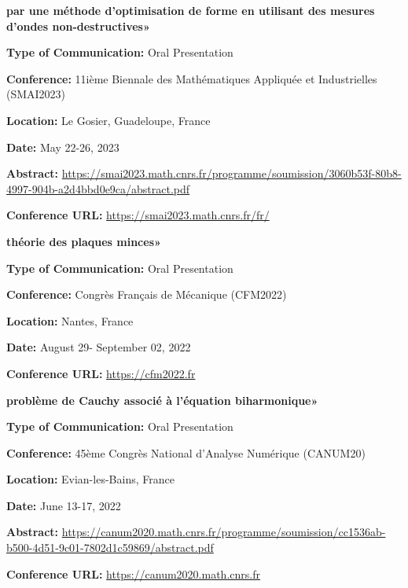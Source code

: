 \documentclass[10pt]{article} %
\begin{document}
{\vspace{-0.13cm}\textbf{par une méthode d’optimisation de forme en utilisant des mesures d’ondes non-destructives»}
	
	\textbf{Type of Communication:} Oral Presentation
	
	\textbf{Conference:} 11ième Biennale des Mathématiques Appliquée et Industrielles (SMAI2023)
	
	\textbf{Location:} Le Gosier, Guadeloupe, France
	
	\textbf{Date:} May 22-26, 2023
	
	\textbf{Abstract:} \href{https://smai2023.math.cnrs.fr/programme/soumission/3060b53f-80b8-4997-904b-a2d4bbd0e9ca/abstract.pdf
	}{https://smai2023.math.cnrs.fr/programme/soumission/3060b53f-80b8-4997-904b-a2d4bbd0e9ca/abstract.pdf
	}
	
	
	\textbf{Conference URL:} \href{https://smai2023.math.cnrs.fr/fr/}{https://smai2023.math.cnrs.fr/fr/}
}

{\vspace{-0.13cm}\textbf{théorie des plaques minces»}
	
	\textbf{Type of Communication:} Oral Presentation
	
	\textbf{Conference:} Congrès Français de Mécanique (CFM2022)
	
	\textbf{Location:} Nantes, France
	
	\textbf{Date:} August 29- September 02,  2022
	
	\textbf{Conference URL:} \href{https://cfm2022.fr/}{https://cfm2022.fr}
}

\newpage 

{\vspace{-0.13cm}\textbf{problème de Cauchy associé à l’équation biharmonique»}
	
	\textbf{Type of Communication:} Oral Presentation
	
	\textbf{Conference:} 45ème Congrès National d'Analyse Numérique (CANUM20)
	
	\textbf{Location:} Evian-les-Bains, France
	
	\textbf{Date:} June 13-17, 2022
	
		\textbf{Abstract:}
	\href{https://canum2020.math.cnrs.fr/programme/soumission/cc1536ab-b500-4d51-9c01-7802d1c59869/abstract.pdf
	}{https://canum2020.math.cnrs.fr/programme/soumission/cc1536ab-b500-4d51-9c01-7802d1c59869/abstract.pdf
	}

	\textbf{Conference URL:} \href{https://canum2020.math.cnrs.fr}{https://canum2020.math.cnrs.fr}
}
\end{document}
